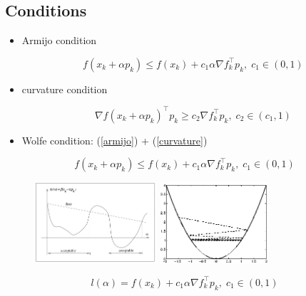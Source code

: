 \subsection{Conditions}

\begin{frame}
  \begin{itemize}

  \item Armijo condition

    \begin{equation} \label{armijo}
    f(x_k + \alpha p_k) \leq f(x_k) + c_1 \alpha \nabla f_{k}^\intercal p_k, \; c_1 \in (0,1)
  \end{equation}

  \item curvature condition

    \begin{equation} \label{curvature}
    \nabla f(x_k + \alpha p_k)^\intercal p_k \geq c_2 \nabla f_{k}^\intercal p_k, \; c_2 \in (c_1, 1)
  \end{equation}

\item Wolfe condition: (\ref{armijo}) + (\ref{curvature})
  \end{itemize}

\end{frame}


\begin{frame}

  \begin{equation*}
    f(x_k + \alpha p_k) \leq f(x_k) + c_1 \alpha \nabla f_{k}^\intercal p_k, \; c_1 \in (0,1)
  \end{equation*}

\begin{figure}
\begin{minipage}{0.48\textwidth}
\centering
\includegraphics[height=3cm]{figures/armijo.png}
\end{minipage}
\begin{minipage}{0.48\textwidth}
\centering
\includegraphics[height=3cm]{figures/armijo2.png}
\end{minipage}

\end{figure}

  \begin{equation*}
    l(\alpha) = f(x_k) + c_1 \alpha \nabla f_{k}^\intercal p_k, \; c_1 \in (0,1)
  \end{equation*}


\end{frame}

